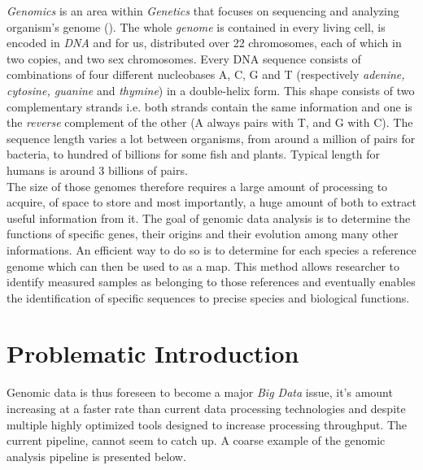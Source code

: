 \textit{Genomics} is an area within \textit{Genetics} that focuses on sequencing and analyzing organism's genome (\cite{genomic}). The whole \textit{genome} is contained in every living cell, is encoded in \textit{DNA} and for us, distributed over 22 chromosomes, each of which in two copies, and two sex chromosomes. Every DNA sequence consists of combinations of four different nucleobases A, C, G and T (respectively \textit{adenine, cytosine, guanine} and \textit{thymine}) in a double-helix form. This shape consists of two complementary strands i.e. both strands contain the same information and one is the \textit{reverse} complement of the other (A always pairs with T, and G with C). The sequence length varies a lot between organisms, from around a million of pairs for bacteria, to hundred of billions for some fish and plants. Typical length for humans is around 3 billions of pairs. \\

The size of those genomes therefore requires a large amount of processing to acquire, of space to store and most importantly, a huge amount of both to extract useful information from it. The goal of genomic data analysis is to determine the functions of specific genes, their origins and their evolution among many other informations. An efficient way to do so is to determine for each species a reference genome which can then be used to as a map. This method allows researcher to identify measured samples as belonging to those references and eventually enables the identification of specific sequences to precise species and biological functions. \\

\section{Problematic Introduction}

Genomic data is thus foreseen to become a major \textit{Big Data} issue, it's amount increasing at a faster rate than current data processing technologies and despite multiple highly optimized tools designed to increase processing throughput. The current pipeline, cannot seem to catch up. A coarse example of the genomic analysis pipeline is presented below. \\


